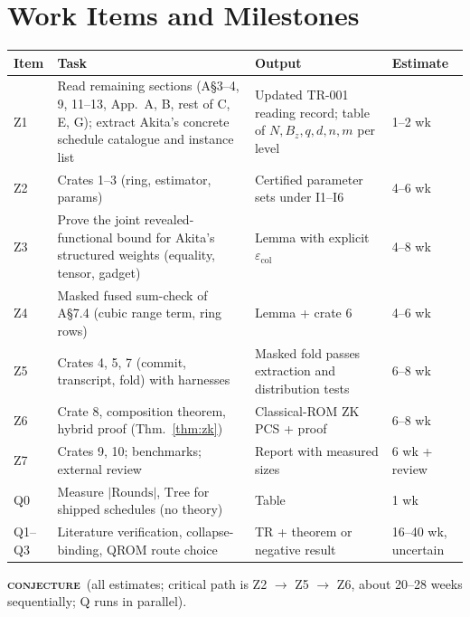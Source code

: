 \documentclass[11pt]{article}
\newcommand{\epitag}[3]{\colorbox{#2}{\textcolor{#1}{\textsc{\footnotesize\bfseries #3}}}}
\newcommand{\conjectureTag}{\epitag{conjyellow}{conjbg}{conjecture}}
\renewcommand{\_}{\textunderscore\allowbreak{}}
\theoremstyle{definition}
\begin{document}
\section{Work Items and Milestones}
\begin{center}
\small\renewcommand{\arraystretch}{1.2}
\begin{longtable}{@{}p{}p{}p{}p{}@{}}
\toprule
\textbf{Item} & \textbf{Task} & \textbf{Output} & \textbf{Estimate}\\
\midrule
\endhead
Z1 & Read remaining sections (A\S3--4, 9, 11--13, App.\ A, B, rest of C, E, G); extract Akita's concrete schedule catalogue and instance list & Updated TR-001 reading record; table of $N,B_z,q,d,n,m$ per level & 1--2 wk\\
Z2 & Crates 1--3 (ring, estimator, params) & Certified parameter sets under I1--I6 & 4--6 wk\\
Z3 & Prove the joint revealed-functional bound for Akita's structured weights (equality, tensor, gadget) & Lemma with explicit $\varepsilon_{\mathrm{col}}$ & 4--8 wk\\
Z4 & Masked fused sum-check of A\S7.4 (cubic range term, ring rows) & Lemma + crate 6 & 4--6 wk\\
Z5 & Crates 4, 5, 7 (commit, transcript, fold) with harnesses & Masked fold passes extraction and distribution tests & 6--8 wk\\
Z6 & Crate 8, composition theorem, hybrid proof (Thm.~\ref{thm:zk}) & Classical-ROM ZK PCS + proof & 6--8 wk\\
Z7 & Crates 9, 10; benchmarks; external review & Report with measured sizes & 6 wk + review\\
Q0 & Measure $|\mathrm{Rounds}|$, $\mathrm{Tree}$ for shipped schedules (no theory) & Table & 1 wk\\
Q1--Q3 & Literature verification, collapse-binding, QROM route choice & TR + theorem or negative result & 16--40 wk, uncertain\\
\bottomrule
\end{longtable}
\end{center}
\conjectureTag\ (all estimates; critical path is Z2 $\to$ Z5 $\to$ Z6, about 20--28 weeks sequentially; Q runs in parallel).
\end{document}
